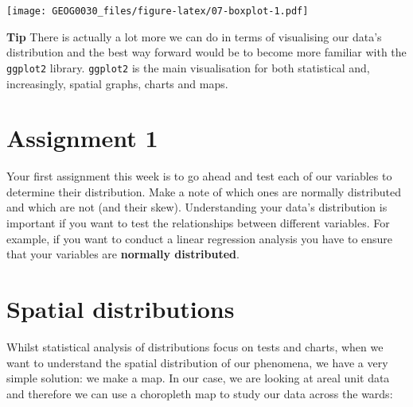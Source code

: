 \documentclass[
]{book}
\newenvironment{Shaded}{\begin{snugshade}}{\end{snugshade}}
\newcommand{\CommentTok}[1]{\textcolor[rgb]{0.56,0.35,0.01}{\textit{#1}}}
\newcommand{\FunctionTok}[1]{\textcolor[rgb]{0.00,0.00,0.00}{#1}}
\newcommand{\NormalTok}[1]{#1}
\newcommand{\SpecialCharTok}[1]{\textcolor[rgb]{0.00,0.00,0.00}{#1}}
\begin{document}
\begin{Shaded}
\end{Shaded}

\texttt{[image: GEOG0030\_files/figure-latex/07-boxplot-1.pdf]}

\textbf{Tip}
There is actually a lot more we can do in terms of visualising our data's distribution and the best way forward would be to become more familiar with the \texttt{ggplot2} library. \texttt{ggplot2} is the main visualisation for both statistical and, increasingly, spatial graphs, charts and maps.

\hypertarget{assignment-1-w07}{%
\section{Assignment 1}\label{assignment-1-w07}}

Your first assignment this week is to go ahead and test each of our variables to determine their distribution. Make a note of which ones are normally distributed and which are not (and their skew). Understanding your data's distribution is important if you want to test the relationships between different variables. For example, if you want to conduct a linear regression analysis you have to ensure that your variables are \textbf{normally distributed}.

\hypertarget{spatial-distributions}{%
\section{Spatial distributions}\label{spatial-distributions}}

Whilst statistical analysis of distributions focus on tests and charts, when we want to understand the spatial distribution of our phenomena, we have a very simple solution: we make a map. In our case, we are looking at areal unit data and therefore we can use a choropleth map to study our data across the wards:
\end{document}
